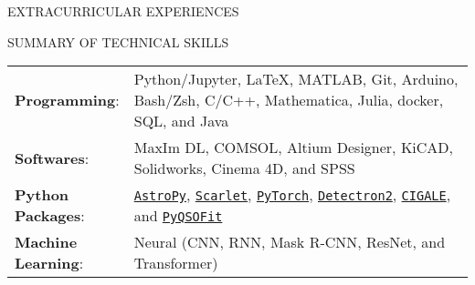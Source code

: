 \documentclass[11pt]{article} %
\begin{document}
\begin{section}{EXTRACURRICULAR EXPERIENCES}

\end{section}

\begin{section}{SUMMARY OF TECHNICAL SKILLS}

\begin{tabular}{@{}p{0.2\linewidth}@{}p{0.8\linewidth}@{}}
    \textbf{Programming}: & Python/Jupyter, \LaTeX, MATLAB, Git, Arduino, Bash/Zsh, C/C++, Mathematica, Julia, docker, SQL, and Java \\
    \textbf{Softwares}: & MaxIm DL, COMSOL, Altium Designer, KiCAD, Solidworks, Cinema 4D, and SPSS \\
    \textbf{Python Packages}: & \href{https://www.astropy.org/}{\texttt{AstroPy}}, \href{https://github.com/pmelchior/scarlet}{\texttt{Scarlet}}, \href{https://pytorch.org/}{\texttt{PyTorch}}, \href{https://github.com/facebookresearch/detectron2}{\texttt{Detectron2}}, \href{https://cigale.lam.fr/}{\texttt{CIGALE}}, and \href{https://github.com/legolason/PyQSOFit}{\texttt{PyQSOFit}} \\
    \textbf{Machine Learning}: & Neural (CNN, RNN, Mask R-CNN, ResNet, and Transformer) \\
\end{tabular}
    
\end{section} 
\end{document}
